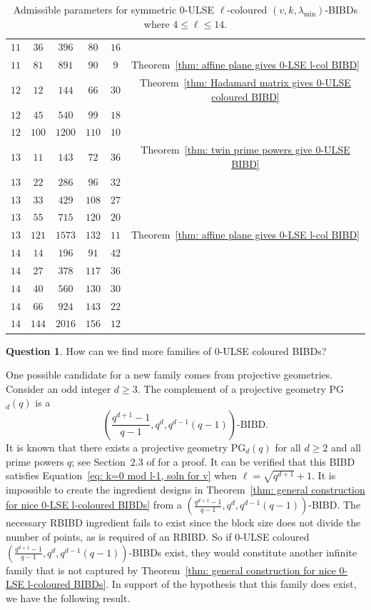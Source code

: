 \documentclass[12pt]{article}
\theoremstyle{definition}
\newtheorem{question}[theorem]{Question}
\begin{document}
\begin{table}[p]
\begin{tabular}{c|c|c|c|c|c}
$11$ & $36$ & $396$ & $80$ & $16$ & \\
$11$ & $81$ & $891$ & $90$ & $9$ & Theorem~\ref{thm: affine plane gives 0-LSE l-col BIBD}\\
$12$ & $12$ & $144$ & $66$ & $30$ & Theorem~\ref{thm: Hadamard matrix gives 0-ULSE coloured BIBD}\\
$12$ & $45$ & $540$ & $99$ & $18$ & \\
$12$ & $100$ & $1200$ & $110$ & $10$ & \\
$13$ & $11$ & $143$ & $72$ & $36$ & Theorem~\ref{thm: twin prime powers give 0-ULSE BIBD}\\
$13$ & $22$ & $286$ & $96$ & $32$ & \\
$13$ & $33$ & $429$ & $108$ & $27$ & \\
$13$ & $55$ & $715$ & $120$ & $20$ & \\
$13$ & $121$ & $1573$ & $132$ & $11$ & Theorem~\ref{thm: affine plane gives 0-LSE l-col BIBD}\\
$14$ & $14$ & $196$ & $91$ & $42$ & \\
$14$ & $27$ & $378$ & $117$ & $36$ & \\
$14$ & $40$ & $560$ & $130$ & $30$ & \\
$14$ & $66$ & $924$ & $143$ & $22$ & \\
$14$ & $144$ & $2016$ & $156$ & $12$ &
    \end{tabular}
    \caption{Admissible parameters for symmetric $0$-ULSE $\ell$-coloured $(v,k,\lambda_{\min})$-BIBDs where $4\leq \ell \leq 14$.}
    \label{tab: k=0 mod l-1, possible BIBDs}
\end{table}

\begin{question}
    How can we find more families of $0$-ULSE coloured BIBDs?
\end{question}

One possible candidate for a new family comes from projective geometries. Consider an odd integer $d\geq 3$. The complement of a projective geometry PG$_d(q)$ is a \[\left(\frac{q^{d+1} - 1}{q-1}, q^d, q^{d-1}(q-1)\right)\text{-BIBD}.\] It is known that there exists a projective geometry PG$_d(q)$ for all $d\geq 2$ and all prime powers $q$; see Section~2.3 of \cite{S04} for a proof. It can be verified that this BIBD satisfies Equation~\eqref{eq: k=0 mod l-1, soln for v} when $\ell = \sqrt{q^{d+1}} + 1$. It is impossible to create the ingredient designs in Theorem~\ref{thm: general construction for nice 0-LSE l-coloured BIBDs} from a $\left(\frac{q^{d+1} - 1}{q-1}, q^d, q^{d-1}(q-1)\right)$-BIBD. The necessary RBIBD ingredient fails to exist since the block size does not divide the number of points, as is required of an RBIBD. So if $0$-ULSE coloured $\left(\frac{q^{d+1} - 1}{q-1}, q^d, q^{d-1}(q-1)\right)$-BIBDs exist, they would constitute another infinite family that is not captured by Theorem~\ref{thm: general construction for nice 0-LSE l-coloured BIBDs}. In support of the hypothesis that this family does exist, we have the following result.
\end{document}
